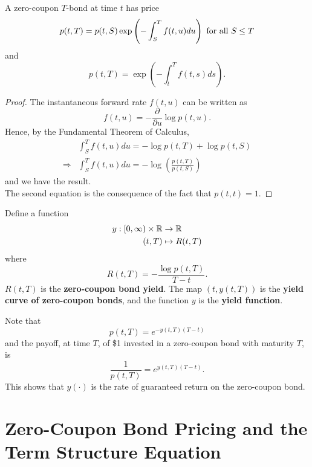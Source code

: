 \documentclass[11pt,fleqn]{book} %
\begin{document}
\begin{proposition} \label{prop:5111}
A zero-coupon \(T\)-bond at time \(t\) has price
\[
p(t, T) = p(t, S)\exp\left(-\int_S^T f(t, u)du\right) \text{ for all } S \leq T
\]
and
\[
p(t, T) = \exp\left(-\int_t^T f(t, s) ds\right).
\]
\end{proposition}
\begin{proof} The instantaneous forward rate \(f(t, u)\) can be written as
\[
f(t, u) = -\frac{\partial}{\partial u} \log p(t, u).
\]
\indent Hence, by the Fundamental Theorem of Calculus,
\[
\begin{aligned}
& \int_S^T f(t, u)du = -\log p(t, T) + \log p(t, S) \\
\Rightarrow &\int_S^T f(t, u)du = -\log\left(\frac{p(t, T)}{p(t, S)}\right)
\end{aligned}
\]
and we have the result. \\
\indent The second equation is the consequence of the fact that \(p(t, t) = 1\).
\end{proof}

\begin{definition} \label{def:5112}
Define a function
\[
\begin{aligned}
y: [0, \infty) \times \mathbb{R} &\rightarrow \mathbb{R} \\
(t, T) &\mapsto R(t, T)
\end{aligned}
\]
where
\[
R(t, T) = -\frac{\log p(t, T)}{T - t}.
\]
\indent \(R(t, T)\) is the \textbf{zero-coupon bond yield}. The map \((t, y(t, T))\) is the \textbf{yield curve of zero-coupon bonds}, and the function \(y\) is the \textbf{yield function}.
\end{definition}

\begin{remark} \label{rmk:5113}
Note that
\[
p(t, T) = e^{-y(t, T)(T - t)}
\]
and the payoff, at time \(T\), of \$1 invested in a zero-coupon bond with maturity \(T\), is
\[
\frac{1}{p(t, T)} = e^{y(t, T)(T - t)}.
\]
\indent This shows that \(y(\cdot)\) is the rate of guaranteed return on the zero-coupon bond.
\end{remark}


\section{Zero-Coupon Bond Pricing and the Term Structure Equation}
\end{document}
